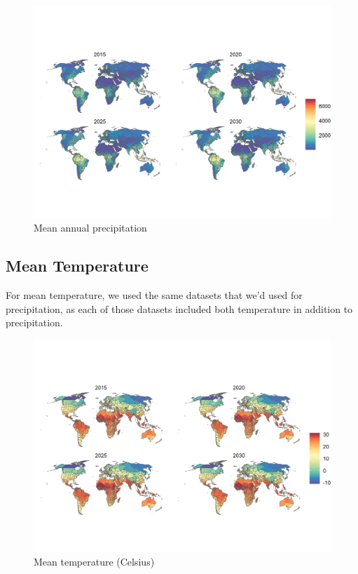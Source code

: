\documentclass{article}
\begin{document}
\begin{figure}[H]
  \centering
  \includegraphics[width=\linewidth]{img/covars/precip.png}
  \caption{Mean annual precipitation}
\end{figure}

\subsection{Mean Temperature}
For mean temperature, we used the same datasets that we'd used for precipitation, as each of those datasets included both temperature in addition to precipitation.

\begin{figure}[H]
  \centering
  \includegraphics[width=\linewidth]{img/covars/tave.png}
  \caption{Mean temperature (Celsius)}
\end{figure}
\end{document}
